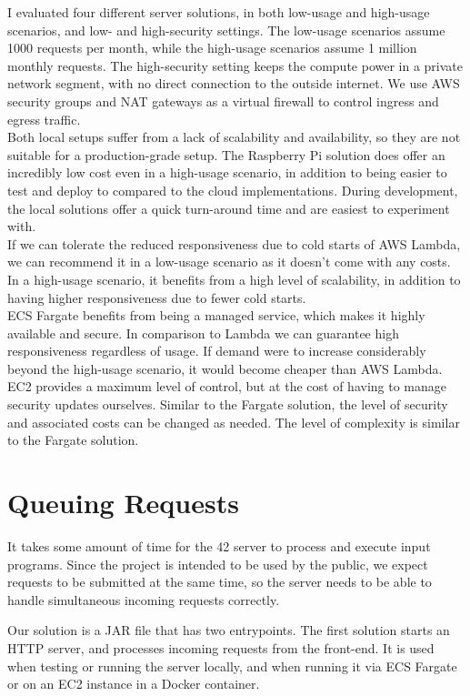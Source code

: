 I evaluated four different server solutions, in both low-usage and high-usage scenarios, and low- and high-security settings. The low-usage scenarios assume 1000 requests per month, while the high-usage scenarios assume 1 million monthly requests. The high-security setting keeps the compute power in a private network segment, with no direct connection to the outside internet. We use AWS security groups and NAT gateways as a virtual firewall to control ingress and egress traffic.
\\[12pt]
Both local setups suffer from a lack of scalability and availability, so they are not suitable for a production-grade setup. The Raspberry Pi solution does offer an incredibly low cost even in a high-usage scenario, in addition to being easier to test and deploy to compared to the cloud implementations. During development, the local solutions offer a quick turn-around time and are easiest to experiment with.
\\[12pt]
If we can tolerate the reduced responsiveness due to cold starts of AWS Lambda, we can recommend it in a low-usage scenario as it doesn't come with any costs. In a high-usage scenario, it benefits from a high level of scalability, in addition to having higher responsiveness due to fewer cold starts.
\\[12pt]
ECS Fargate benefits from being a managed service, which makes it highly available and secure. In comparison to Lambda we can guarantee high responsiveness regardless of usage. If demand were to increase considerably beyond the high-usage scenario, it would become cheaper than AWS Lambda.
\\[12pt]
EC2 provides a maximum level of control, but at the cost of having to manage security updates ourselves. Similar to the Fargate solution, the level of security and associated costs can be changed as needed. The level of complexity is similar to the Fargate solution.

\section{Queuing Requests}

It takes some amount of time for the 42 server to process and execute input programs. Since the project is intended to be used by the public, we expect requests to be submitted at the same time, so the server needs to be able to handle simultaneous incoming requests correctly.

Our solution is a JAR file that has two entrypoints. The first solution starts an HTTP server, and processes incoming requests from the front-end. It is used when testing or running the server locally, and when running it via ECS Fargate or on an EC2 instance in a Docker container.

